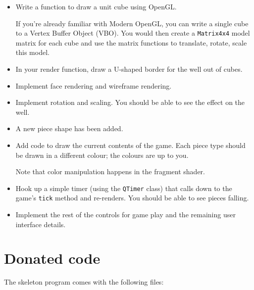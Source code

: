 \begin{itemize}
	\item Write a function to draw a unit cube using OpenGL. 

            If you're already familiar with Modern OpenGL, you can
            write a single cube to a Vertex Buffer Object (VBO). You
            would then create a \texttt{Matrix4x4} model matrix for
            each cube and use the matrix functions to translate,
            rotate, scale this model. 

	\item In your render function, draw a U-shaped border for
	      the well out of cubes.

	\item Implement face rendering and wireframe
		  rendering.

	\item Implement rotation and scaling.  You should be
	      able to see the effect on the well.

\iffalse
	\item Implement single- and double-buffering.
		  You should be able to see the difference when rotating
		  the well.
\fi

	\item A new piece shape has been added.

	\item Add code to draw the current contents of the game.
		  Each piece type should be drawn in a different colour;
		  the colours are up to you.

              Note that color manipulation happens in the fragment shader.

	\item Hook up a simple timer (using the \texttt{QTimer}
		  class) that calls down to the game's
		  \texttt{tick} method and re-renders.  You should be able to see
		  pieces falling.

	\item Implement the rest of the controls for game play and
		  the remaining user interface details.
\end{itemize}

\section{Donated code}

The skeleton program comes with the following files:

